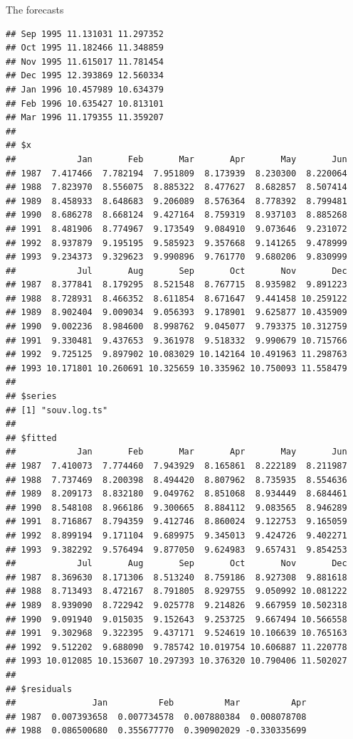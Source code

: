 \documentclass[ignorenonframetext,]{beamer}
\begin{document}
\begin{frame}[fragile]{The forecasts}
\begin{verbatim}
## Sep 1995 11.131031 11.297352
## Oct 1995 11.182466 11.348859
## Nov 1995 11.615017 11.781454
## Dec 1995 12.393869 12.560334
## Jan 1996 10.457989 10.634379
## Feb 1996 10.635427 10.813101
## Mar 1996 11.179355 11.359207
## 
## $x
##            Jan       Feb       Mar       Apr       May       Jun
## 1987  7.417466  7.782194  7.951809  8.173939  8.230300  8.220064
## 1988  7.823970  8.556075  8.885322  8.477627  8.682857  8.507414
## 1989  8.458933  8.648683  9.206089  8.576364  8.778392  8.799481
## 1990  8.686278  8.668124  9.427164  8.759319  8.937103  8.885268
## 1991  8.481906  8.774967  9.173549  9.084910  9.073646  9.231072
## 1992  8.937879  9.195195  9.585923  9.357668  9.141265  9.478999
## 1993  9.234373  9.329623  9.990896  9.761770  9.680206  9.830999
##            Jul       Aug       Sep       Oct       Nov       Dec
## 1987  8.377841  8.179295  8.521548  8.767715  8.935982  9.891223
## 1988  8.728931  8.466352  8.611854  8.671647  9.441458 10.259122
## 1989  8.902404  9.009034  9.056393  9.178901  9.625877 10.435909
## 1990  9.002236  8.984600  8.998762  9.045077  9.793375 10.312759
## 1991  9.330481  9.437653  9.361978  9.518332  9.990679 10.715766
## 1992  9.725125  9.897902 10.083029 10.142164 10.491963 11.298763
## 1993 10.171801 10.260691 10.325659 10.335962 10.750093 11.558479
## 
## $series
## [1] "souv.log.ts"
## 
## $fitted
##            Jan       Feb       Mar       Apr       May       Jun
## 1987  7.410073  7.774460  7.943929  8.165861  8.222189  8.211987
## 1988  7.737469  8.200398  8.494420  8.807962  8.735935  8.554636
## 1989  8.209173  8.832180  9.049762  8.851068  8.934449  8.684461
## 1990  8.548108  8.966186  9.300665  8.884112  9.083565  8.946289
## 1991  8.716867  8.794359  9.412746  8.860024  9.122753  9.165059
## 1992  8.899194  9.171104  9.689975  9.345013  9.424726  9.402271
## 1993  9.382292  9.576494  9.877050  9.624983  9.657431  9.854253
##            Jul       Aug       Sep       Oct       Nov       Dec
## 1987  8.369630  8.171306  8.513240  8.759186  8.927308  9.881618
## 1988  8.713493  8.472167  8.791805  8.929755  9.050992 10.081222
## 1989  8.939090  8.722942  9.025778  9.214826  9.667959 10.502318
## 1990  9.091940  9.015035  9.152643  9.253725  9.667494 10.566558
## 1991  9.302968  9.322395  9.437171  9.524619 10.106639 10.765163
## 1992  9.512202  9.688090  9.785742 10.019754 10.606887 11.220778
## 1993 10.012085 10.153607 10.297393 10.376320 10.790406 11.502027
## 
## $residuals
##               Jan          Feb          Mar          Apr
## 1987  0.007393658  0.007734578  0.007880384  0.008078708
## 1988  0.086500680  0.355677770  0.390902029 -0.330335699

\end{verbatim}
\end{frame}
\end{document}
